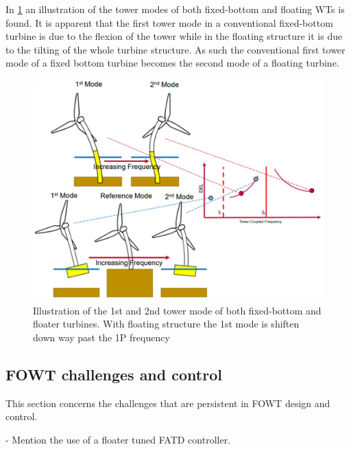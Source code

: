 In \cref{fig:eigen_and_1p3p} an illustration of the tower modes of both fixed-bottom and floating WTs is found. It is apparent that the first tower mode in a conventional fixed-bottom turbine is due to the flexion of the tower while in the floating structure it is due to the tilting of the whole turbine structure. As such the conventional first tower mode of a fixed bottom turbine becomes the second mode of a floating turbine.
\begin{figure}[ht]
	\centering
	\includegraphics[width=0.7\linewidth]{Graphics/1P3PandEigenFloater.png}
	\caption{Illustration of the 1st and 2nd tower mode of both fixed-bottom and floater turbines. With floating structure the 1st mode is shiften down way past the 1P frequency}
	\label{fig:eigen_and_1p3p}
\end{figure}


\subsection{FOWT challenges and control} \label{sec:theo_fowt_challenges}
This section concerns the challenges that are persistent in FOWT design and control.



- Mention the use of a floater tuned FATD controller.
